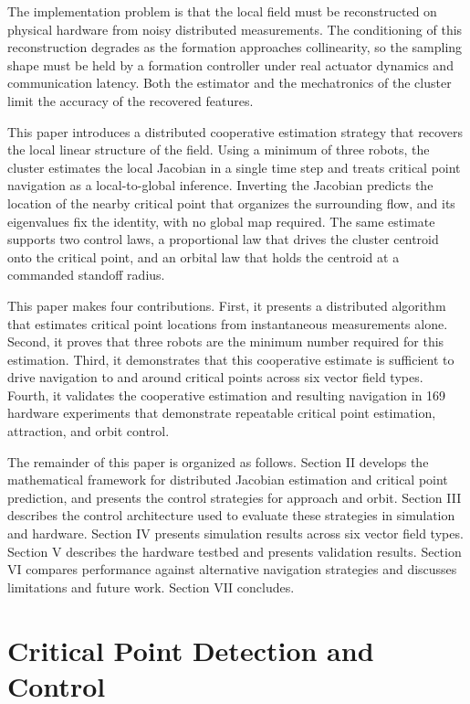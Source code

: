 \documentclass[lettersize,journal]{IEEEtran}
\begin{document}
The implementation problem is that the local field must be reconstructed on physical hardware from noisy distributed measurements. The conditioning of this reconstruction degrades as the formation approaches collinearity, so the sampling shape must be held by a formation controller under real actuator dynamics and communication latency. Both the estimator and the mechatronics of the cluster limit the accuracy of the recovered features.

This paper introduces a distributed cooperative estimation strategy that recovers the local linear structure of the field. Using a minimum of three robots, the cluster estimates the local Jacobian in a single time step and treats critical point navigation as a local-to-global inference. Inverting the Jacobian predicts the location of the nearby critical point that organizes the surrounding flow, and its eigenvalues fix the identity, with no global map required. The same estimate supports two control laws, a proportional law that drives the cluster centroid onto the critical point, and an orbital law that holds the centroid at a commanded standoff radius.

This paper makes four contributions. First, it presents a distributed algorithm that estimates critical point locations from instantaneous measurements alone. Second, it proves that three robots are the minimum number required for this estimation. Third, it demonstrates that this cooperative estimate is sufficient to drive navigation to and around critical points across six vector field types. Fourth, it validates the cooperative estimation and resulting navigation in 169 hardware experiments that demonstrate repeatable critical point estimation, attraction, and orbit control.

The remainder of this paper is organized as follows. Section II develops the mathematical framework for distributed Jacobian estimation and critical point prediction, and presents the control strategies for approach and orbit. Section III describes the control architecture used to evaluate these strategies in simulation and hardware. Section IV presents simulation results across six vector field types. Section V describes the hardware testbed and presents validation results. Section VI compares performance against alternative navigation strategies and discusses limitations and future work. Section VII concludes.

\section{Critical Point Detection and Control}
\end{document}
